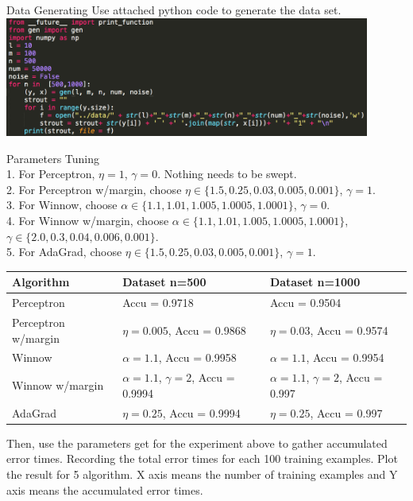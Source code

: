 \item[(a)] Data Generating
Use attached python code to generate the data set.\\
\includegraphics[width = 0.9\textwidth]{pythoncode.png}

\item[(b)]Parameters Tuning\\
1. For Perceptron, $\eta = 1$, $\gamma = 0$. Nothing needs to be swept.\\ 
2. For Perceptron w/margin, choose $\eta \in \{1.5,0.25,0.03,0.005,0.001\}$, $\gamma = 1$.\\ 
3. For Winnow, choose $\alpha \in \{1.1,1.01,1.005,1.0005,1.0001\}$, $\gamma = 0$.\\
4. For Winnow w/margin, choose $\alpha \in \{1.1,1.01,1.005,1.0005,1.0001\}$, \\$\gamma \in \{2.0,0.3,0.04,0.006,0.001\}$.\\
5. For AdaGrad, choose $\eta \in \{1.5,0.25,0.03,0.005,0.001\}$, $\gamma = 1$.
  \begin{center}
    \begin{tabular}{|p{2.2cm}|p{6cm}|p{6cm}|}
      \hline
      Algorithm  &  Dataset n=500 & Dataset n=1000\\\hline\hline
      Perceptron &  Accu = 0.9718 &   Accu = 0.9504\\\hline
      Perceptron w/margin & $\eta=0.005$, Accu = 0.9868 & $\eta=0.03$, Accu = 0.9574\\\hline
      Winnow   & $\alpha=1.1$, Accu = 0.9958 & $\alpha=1.1$, Accu = 0.9954 \\\hline
      Winnow w/margin   & $\alpha=1.1$, $\gamma=2$, Accu = 0.9994 & $\alpha=1.1$, $\gamma=2$, Accu = 0.997 \\\hline
      AdaGrad  & $\eta=0.25$, Accu = 0.9994 & $\eta=0.25$, Accu = 0.997 \\\hline
    \end{tabular}
  \end{center}
Then, use the parameters get for the experiment above to gather accumulated error times. Recording the total error times for each 100 training examples. Plot the result for 5 algorithm. X axis means the number of training examples and Y axis means the accumulated error times.\\
